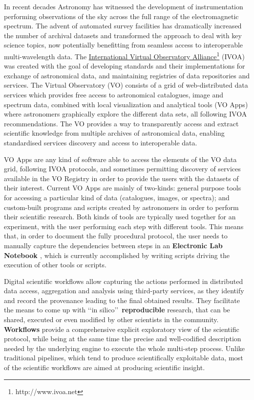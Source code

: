 \documentclass{aa}
\begin{document}
In recent decades Astronomy has witnessed the development of instrumentation performing observations of the sky across the full range of the electromagnetic spectrum. The advent of automated survey facilities has dramatically increased the number of archival datasets and transformed the approach to deal with key science topics, now potentially benefitting from seamless access to interoperable multi-wavelength data. The \href{http://www.ivoa.net}{International Virtual  Observatory Alliance}\footnote{http://www.ivoa.net} (IVOA) was created with the goal of developing standards and their implementations for exchange of astronomical data, and maintaining registries of data repositories and services. The Virtual Observatory (VO) consists of a grid of web-distributed data services which provides free access to astronomical catalogues, image and spectrum data, combined with local visualization and analytical tools (VO Apps) where astronomers graphically explore the different data sets, all following IVOA recommendations. The VO provides a way to transparently access and extract scientific knowledge from multiple archives of astronomical data, enabling standardised services discovery and access to interoperable data. 

VO Apps are any kind of software able to access the elements of the VO data grid, following IVOA protocols, and sometimes permitting discovery of services available in the VO Registry \citep{Benson2009} in order to provide the users with the datasets of their interest. Current VO Apps are mainly of two-kinds: general purpose tools for accessing a particular kind of data (catalogues, images, or spectra); and custom-built programs and scripts created by astronomers in order to perform their scientific research. Both kinds of tools are typically used together for an experiment, with the user performing each step with different tools. This means that, in order to document the fully procedural protocol, the user needs to manually capture the dependencies between steps in an \textbf{Electronic Lab Notebook \citep{5577251}}, which is currently accomplished by writing scripts driving the execution of other tools or scripts.

Digital scientific workflows \citep{Gil2007, Gil2008} allow capturing the actions performed in distributed data access, aggregation and analysis using third-party services, as they identify and record the provenance leading to the final obtained results. They facilitate the means to come up with \lq\lq in silico\rq\rq\ \textbf{reproducible} research, that can be shared, executed or even modified by other scientists in the community. \textbf{Workflows} provide a comprehensive explicit exploratory view of the scientific protocol, while being at the same time the precise and well-codified description needed by the underlying engine to execute the whole multi-step process. Unlike traditional pipelines, which tend to produce scientifically exploitable data, most of the scientific workflows are aimed at producing scientific insight.
\end{document}
